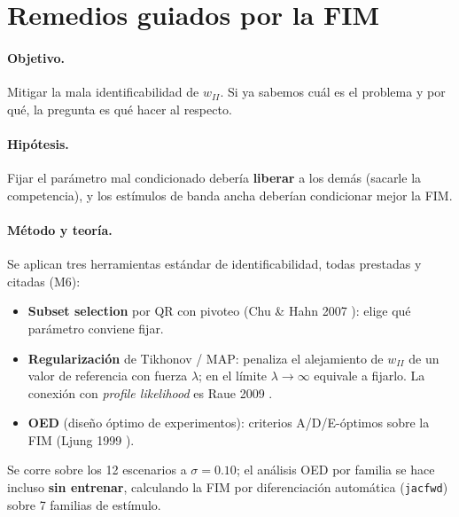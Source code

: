 \documentclass[11pt,a4paper]{article}
\begin{document}
\section{Remedios guiados por la FIM}
\label{sec:remedios}

\paragraph{Objetivo.} Mitigar la mala identificabilidad de $w_{II}$. Si ya sabemos cuál es el problema y por qué, la pregunta es qué hacer al respecto.

\paragraph{Hipótesis.} Fijar el parámetro mal condicionado debería \textbf{liberar} a los demás (sacarle la competencia), y los estímulos de banda ancha deberían condicionar mejor la FIM.

\paragraph{Método y teoría.} Se aplican tres herramientas estándar de identificabilidad, todas prestadas y citadas (M6):
\begin{itemize}[leftmargin=1.4em,itemsep=2pt]
\item \textbf{Subset selection} por QR con pivoteo (Chu \& Hahn 2007 \cite{chuhahn}): elige qué parámetro conviene fijar.
\item \textbf{Regularización} de Tikhonov / MAP: penaliza el alejamiento de $w_{II}$ de un valor de referencia con fuerza $\lambda$; en el límite $\lambda\to\infty$ equivale a fijarlo. La conexión con \emph{profile likelihood} es Raue 2009 \cite{raue}.
\item \textbf{OED} (diseño óptimo de experimentos): criterios A/D/E-óptimos sobre la FIM (Ljung 1999 \cite{ljung}).
\end{itemize}
Se corre sobre los 12 escenarios a $\sigma=0.10$; el análisis OED por familia se hace incluso \textbf{sin entrenar}, calculando la FIM por diferenciación automática (\texttt{jacfwd}) sobre 7 familias de estímulo.
\end{document}
